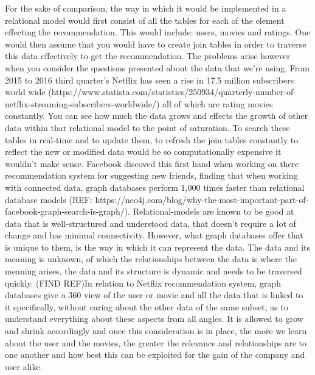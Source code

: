 \documentclass[a4paper]{article}
\begin{document}
For the sake of comparison, the way in which it would be implemented in a relational model would first consist of all the tables for each of the element effecting the recommendation. This would include: users, movies and ratings. One would then assume that you would have to create join tables in order to traverse this data effectively to get the recommendation. The problems arise however when you consider the questions presented about the data that we're using. From 2015 to 2016 third quarter's Netflix has seen a rise in 17.5 million subscribers world wide (https://www.statista.com/statistics/250934/quarterly-number-of-netflix-streaming-subscribers-worldwide/) all of which are rating movies constantly. You can see how much the data grows and effects the growth of other data within that relational model to the point of saturation. To search these tables in real-time and to update them, to refresh the join tables constantly to reflect the new or modified data would be so computationally expensive it wouldn't make sense. Facebook discoved this first hand when working on there recommendation system for suggesting new friends, finding that when working with connected data, graph databases perform 1,000 times faster than relational database models (REF: https://neo4j.com/blog/why-the-most-important-part-of-facebook-graph-search-is-graph/). Relational-models are known to be good at data that is well-structured and understood data, that doesn't require a lot of change and has minimal connectivity. However, what graph databases offer that is unique to them, is the way in which it can represent the data. The data and its meaning is unknown, of which the relationships between the data is where the meaning arises, the data and its structure is dynamic and needs to be traversed quickly. (FIND REF)In relation to Netflix recommendation system, graph databases give a 360 view of the user or movie and all the data that is linked to it specifically, without caring about the other data of the same subset, as to understand everything about these aspects from all angles. It is allowed to grow and shrink accordingly and once this consideration is in place, the more we learn about the user and the movies, the greater the relevance and relationships are to one another and how best this can be exploited for the gain of the company and user alike.
\end{document}
